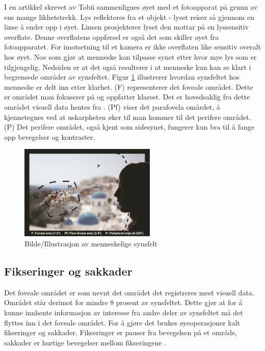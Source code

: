 \documentclass[phd,tocprelim]{cornell}
\begin{document}
I en artikkel skrevet av Tobii \cite{Calibration} sammenlignes øyet med et fotoapparat på grunn av ens mange likhetstrekk. Lys reflekteres fra et objekt - lyset reiser så gjennom en linse å ender opp i øyet. Linsen prosjekterer lyset den mottar på en lyssensitiv overflate. Denne overflatens oppførsel er også det som skiller øyet fra fotoapparatet. For imotsetning til et kamera er ikke overflaten like sensitiv overalt hos øyet. Noe som gjør at menneske kan tilpasse synet etter hvor mye lys som er tilgjengelig. Nedsiden er at det også resulterer i at menneske kun kan se klart i begrensede områder av synsfeltet. Figur \ref{fig:visueltArea} illustrerer hvordan synsfeltet hos menneske er delt inn etter klarhet. (F) representerer det foveale området. Dette er området man fokuserer på og oppfatter klarest. Det er hovedsaklig fra dette området visuell data hentes fra . (Pf) viser det parafovela omårdet, å kjennetegnes ved at uskarpheten øker til man kommer til det perifere området. (P) Det perifere området, også kjent som sidesynet, fungerer kun bra til å fange opp bevegelser og kontraster.

\begin{figure}[ht!]
\centering
\includegraphics[width=65mm]{fovealArea}
\caption{Bilde/Illustrasjon av menneskelige synsfelt \cite{VisualImage}}
\label{fig:visueltArea}
\end{figure}

\subsection{Fikseringer og sakkader}

Det foveale området er som nevnt det området det registreres mest visuell data. Området står derimot for mindre 8 prosent av synsfeltet. Dette gjør at for å kunne innhente informasjon av interesse fra andre deler av synsfeltet må det flyttes inn i  det foveale området. For å gjøre det brukes øyeoperasjoner kalt fikseringer og sakkader. Fikseringer er pauser fra bevegelsen på et område, sakkader er hurtige bevegelser mellom fikseringene \cite{Calibration}.
\end{document}
